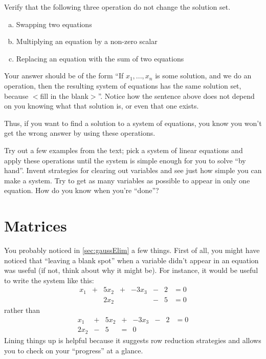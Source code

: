 \documentclass[Main.tex]{subfiles}
\begin{document}
\begin{Ex}
  \label{sec:gaussElimRules}
  Verify that the following three operation do not change the solution set.  
  \begin{enumerate}[a)]
  \item Swapping two equations
  \item Multiplying an equation by a non-zero scalar
  \item Replacing an equation with the sum of two equations
  \end{enumerate}
  Your answer should be of the form ``If $x_1,...,x_n$ is some solution, and we do an operation, then the resulting system of equations has the same solution set, because $<$fill in the blank$>$''.  Notice how the sentence above does not depend on you knowing what that solution is, or even that one exists.  
\end{Ex}

Thus, if you want to find a solution to a system of equations, you know you won't get the wrong answer by using these operations.  
\begin{ImpEx}
  \label{sec:gaussElim}
  Try out a few examples from the text; pick a system of linear equations and apply these operations until the system is simple enough for you to solve ``by hand''.
  Invent strategies for clearing out variables and see just how simple you can make a system.
  Try to get as many variables as possible to appear in only one equation.
  How do you know when you're ``done''?
\end{ImpEx}



\exersisese

\section{Matrices}

You probably noticed in \ref{sec:gaussElim} a few things.
First of all, you might have noticed that ``leaving a blank spot'' when a variable didn't appear in an equation was useful (if not, think about why it might be).  
For instance, it would be useful to write the system like this:
\[\begin{array}{ccccccccc}
  x_1 & + & 5x_2 & + & -3x_3 & - & 2 & = 0\\
   &  & 2x_2 & &  & - & 5 & = 0
\end{array}\]
rather than
\[\begin{array}{ccccccccc}
  x_1 & + & 5x_2 & + & -3x_3 & - & 2 & = 0\\
   2x_2 & -& 5 & = & 0
\end{array}\]
Lining things up is helpful because it suggests row reduction strategies and allows you to check on your ``progress'' at a glance.
\end{document}

